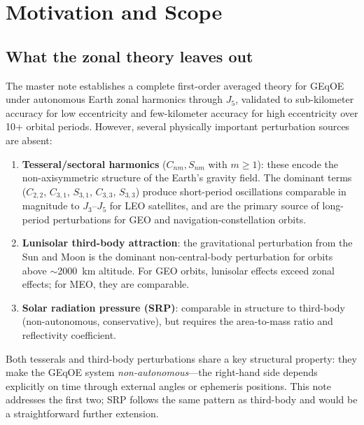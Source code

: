 \documentclass[11pt]{article}
\begin{document}
\section{Motivation and Scope}
\label{sec:motivation}

\subsection{What the zonal theory leaves out}

The master note establishes a complete first-order averaged theory for GEqOE
under autonomous Earth zonal harmonics through $J_5$, validated to
sub-kilometer accuracy for low eccentricity and few-kilometer accuracy for
high eccentricity over 10+ orbital periods. However, several physically
important perturbation sources are absent:

\begin{enumerate}
    \item \textbf{Tesseral/sectoral harmonics} ($C_{nm}, S_{nm}$ with
    $m \ge 1$): these encode the non-axisymmetric structure of the Earth's
    gravity field. The dominant terms ($C_{2,2}$, $C_{3,1}$, $S_{3,1}$,
    $C_{3,3}$, $S_{3,3}$) produce short-period oscillations comparable in
    magnitude to $J_3$--$J_5$ for LEO satellites, and are the primary source
    of long-period perturbations for GEO and navigation-constellation
    orbits.

    \item \textbf{Lunisolar third-body attraction}: the gravitational
    perturbation from the Sun and Moon is the dominant non-central-body
    perturbation for orbits above $\sim$2000~km altitude. For GEO orbits,
    lunisolar effects exceed zonal effects; for MEO, they are comparable.

    \item \textbf{Solar radiation pressure (SRP)}: comparable in structure
    to third-body (non-autonomous, conservative), but requires the
    area-to-mass ratio and reflectivity coefficient.
\end{enumerate}

Both tesserals and third-body perturbations share a key structural
property: they make the GEqOE system \emph{non-autonomous}---the
right-hand side depends explicitly on time through external angles or
ephemeris positions. This note addresses the first two; SRP follows the
same pattern as third-body and would be a straightforward further
extension.
\end{document}

